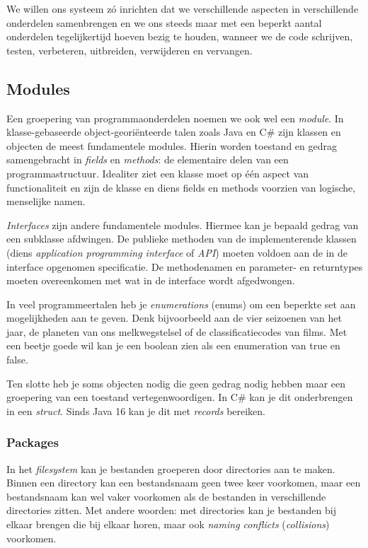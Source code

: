 We willen ons systeem zó inrichten dat we verschillende aspecten
in verschillende onderdelen samenbrengen en we ons steeds maar met een
beperkt aantal onderdelen tegelijkertijd hoeven bezig te houden,
wanneer we de code schrijven, testen, verbeteren, 
uitbreiden, verwijderen en vervangen.

\subsection{Modules}
Een groepering van programmaonderdelen noemen we ook wel een \emph{module}.
In klasse-gebaseerde object-georiënteerde talen zoals Java en C\# 
zijn klassen en objecten de meest fundamentele modules. 
Hierin worden toestand en gedrag samengebracht in \emph{fields} en \emph{methods}:
de elementaire delen van een programmastructuur. 
Idealiter ziet een klasse moet op één aspect van functionaliteit 
en zijn de klasse en diens fields en methods voorzien van logische, menselijke namen.

\emph{Interfaces} zijn andere fundamentele modules. 
Hiermee kan je bepaald gedrag van een subklasse afdwingen.
De publieke methoden van de implementerende klassen 
(diens \emph{application programming interface} of \emph{API}) moeten 
voldoen aan de in de interface opgenomen specificatie.
De methodenamen en parameter- en returntypes moeten overeenkomen met wat 
in de interface wordt afgedwongen.

In veel programmeertalen heb je \emph{enumerations} (enums) 
om een beperkte set aan mogelijkheden aan te geven. Denk bijvoorbeeld aan 
de vier seizoenen van het jaar, de planeten van ons melkwegstelsel 
of de classificatiecodes van films. Met een beetje goede wil kan je 
een boolean zien als een enumeration van true en false.

Ten slotte heb je soms objecten nodig die geen gedrag nodig hebben
maar een groepering van een toestand vertegenwoordigen. 
In C\# kan je dit onderbrengen in een \emph{struct}. 
Sinds Java 16 kan je dit met \emph{records} bereiken.

\subsubsection{Packages}
In het \emph{filesystem} kan je bestanden groeperen door directories aan te maken.
Binnen een directory kan een bestandsnaam geen twee keer voorkomen, 
maar een bestandsnaam kan wel vaker voorkomen als de bestanden in verschillende
directories zitten. Met andere woorden: met directories kan je bestanden
bij elkaar brengen die bij elkaar horen, 
maar ook \emph{naming conflicts} (\emph{collisions}) voorkomen.

